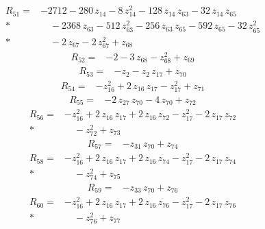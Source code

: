 \documentclass[10pt]{article}
\begin{document}
\begin{align*}
R_{51}={}& - 2712 - 280\,z_{14} - 8\,z_{14}^{2} - 128\,z_{14}\,z_{63} - 32\,z_{14}\,z_{65} \\*
&\quad - 2368\,z_{63} - 512\,z_{63}^{2} - 256\,z_{63}\,z_{65} - 592\,z_{65} - 32\,z_{65}^{2} \\*
&\quad - 2\,z_{67} - 2\,z_{67}^{2} + z_{68}
\end{align*}
\begin{align*}
R_{52}={}& - 2 - 3\,z_{68} - z_{68}^{2} + z_{69}
\end{align*}
\begin{align*}
R_{53}={}& - z_{2} - z_{2}\,z_{17} + z_{70}
\end{align*}
\begin{align*}
R_{54}={}& - z_{16}^{2} + 2\,z_{16}\,z_{17} - z_{17}^{2} + z_{71}
\end{align*}
\begin{align*}
R_{55}={}& - 2\,z_{27}\,z_{70} - 4\,z_{70} + z_{72}
\end{align*}
\begin{align*}
R_{56}={}& - z_{16}^{2} + 2\,z_{16}\,z_{17} + 2\,z_{16}\,z_{72} - z_{17}^{2} - 2\,z_{17}\,z_{72} \\*
&\quad - z_{72}^{2} + z_{73}
\end{align*}
\begin{align*}
R_{57}={}& - z_{31}\,z_{70} + z_{74}
\end{align*}
\begin{align*}
R_{58}={}& - z_{16}^{2} + 2\,z_{16}\,z_{17} + 2\,z_{16}\,z_{74} - z_{17}^{2} - 2\,z_{17}\,z_{74} \\*
&\quad - z_{74}^{2} + z_{75}
\end{align*}
\begin{align*}
R_{59}={}& - z_{33}\,z_{70} + z_{76}
\end{align*}
\begin{align*}
R_{60}={}& - z_{16}^{2} + 2\,z_{16}\,z_{17} + 2\,z_{16}\,z_{76} - z_{17}^{2} - 2\,z_{17}\,z_{76} \\*
&\quad - z_{76}^{2} + z_{77}
\end{align*}
\end{document}

